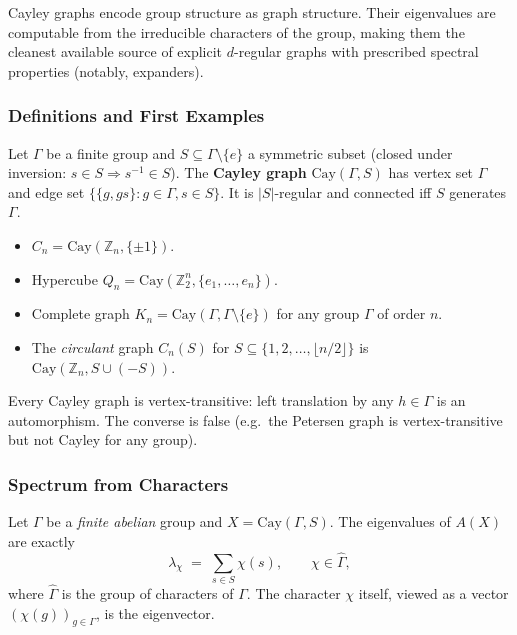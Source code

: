 Cayley graphs encode group structure as graph structure. Their
eigenvalues are computable from the irreducible characters of the
group, making them the cleanest available source of explicit
$d$-regular graphs with prescribed spectral properties (notably,
expanders).

\subsubsection{Definitions and First Examples}

\begin{definition}\label{def:cayley}
Let $\Gamma$ be a finite group and $S \subseteq \Gamma \setminus \{e\}$
a symmetric subset (closed under inversion: $s \in S \Rightarrow s^{-1} \in S$).
The \textbf{Cayley graph} $\mathrm{Cay}(\Gamma, S)$ has vertex set
$\Gamma$ and edge set $\{\{g, gs\} : g \in \Gamma, s \in S\}$. It is
$|S|$-regular and connected iff $S$ generates $\Gamma$.
\end{definition}

\begin{example}
\mbox{}
\begin{itemize}
  \item $C_n = \mathrm{Cay}(\mathbb Z_n, \{\pm 1\})$.
  \item Hypercube $Q_n = \mathrm{Cay}(\mathbb Z_2^n, \{e_1, \ldots, e_n\})$.
  \item Complete graph $K_n = \mathrm{Cay}(\Gamma, \Gamma \setminus \{e\})$
        for any group $\Gamma$ of order $n$.
  \item The \emph{circulant} graph $C_n(S)$ for $S \subseteq \{1, 2, \ldots, \lfloor n/2 \rfloor\}$
        is $\mathrm{Cay}(\mathbb Z_n, S \cup (-S))$.
\end{itemize}
\end{example}

\begin{theorem}\label{thm:cayleyvt}
Every Cayley graph is vertex-transitive: left translation by any
$h \in \Gamma$ is an automorphism. The converse is false (e.g.\ the
Petersen graph is vertex-transitive but not Cayley for any group).
\end{theorem}

\subsubsection{Spectrum from Characters}

\begin{theorem}\label{thm:cayleyabelian}
Let $\Gamma$ be a \emph{finite abelian} group and
$X = \mathrm{Cay}(\Gamma, S)$. The eigenvalues of $A(X)$ are exactly
\[
  \lambda_\chi \;=\; \sum_{s \in S} \chi(s),
  \qquad \chi \in \widehat{\Gamma},
\]
where $\widehat{\Gamma}$ is the group of characters of $\Gamma$. The
character $\chi$ itself, viewed as a vector $(\chi(g))_{g \in \Gamma}$,
is the eigenvector.
\end{theorem}

